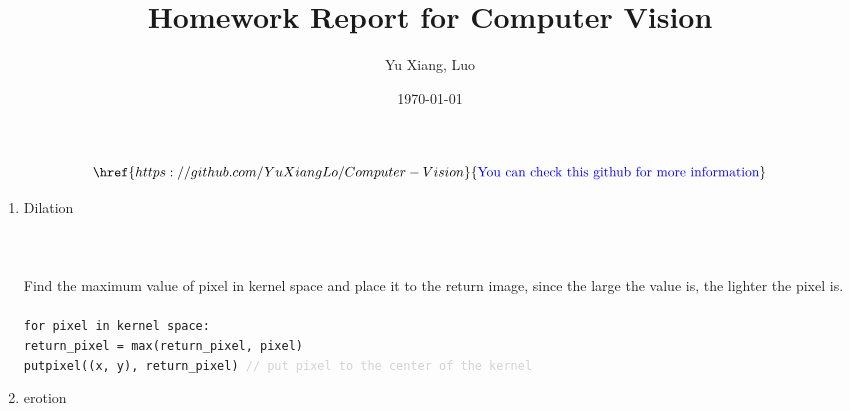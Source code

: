 \documentclass[12pt,a4paper]{article}
\title{Homework Report for Computer Vision}
\author{Yu Xiang, Luo}
\date{\today}
\begin{document}
\maketitle

\[
	\href{https://github.com/YuXiangLo/Computer-Vision}{\text{\textcolor{blue}{You can check this github for more information}}}
\]

\begin{enumerate}[label=(\alph*)]
	\item Dilation\\
		\\
		\\
		\\
		{\small Find the maximum value of pixel in kernel space and place it to the return image,
		since the large the value is, the lighter the pixel is.\\}
		\\
		\texttt{for pixel in kernel space:\\
		\text{\ \ \ \ }return\_pixel = max(return\_pixel, pixel)\\
		putpixel((x, y), return\_pixel) \textcolor{lightgray}{// put pixel to the center of the kernel}}
		\newpage
	\item erotion\\
		\\
		\\
		\\

\end{enumerate}
\end{document}
